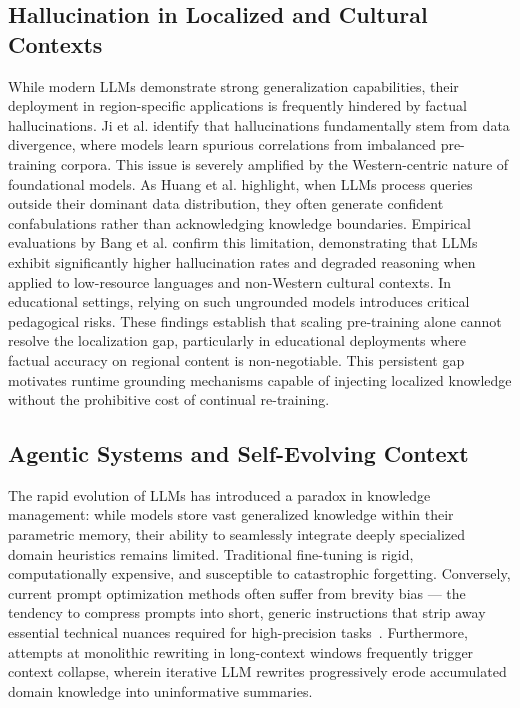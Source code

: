 \documentclass[10pt,conference]{IEEEtran}
\begin{document}
\subsection{Hallucination in Localized and Cultural Contexts}
While modern LLMs demonstrate strong generalization capabilities, their deployment in region-specific applications is frequently hindered by factual hallucinations. Ji et al. \cite{ji2023survey} identify that hallucinations fundamentally stem from data divergence, where models learn spurious correlations from imbalanced pre-training corpora. This issue is severely amplified by the Western-centric nature of foundational models. As Huang et al. \cite{huang2023survey} highlight, when LLMs process queries outside their dominant data distribution, they often generate confident confabulations rather than acknowledging knowledge boundaries. Empirical evaluations by Bang et al. \cite{bang2023multitask} confirm this limitation, demonstrating that LLMs exhibit significantly higher hallucination rates and degraded reasoning when applied to low-resource languages and non-Western cultural contexts. In educational settings, relying on such ungrounded models introduces critical pedagogical risks. These findings establish that scaling pre-training alone cannot resolve 
the localization gap, particularly in educational deployments where 
factual accuracy on regional content is non-negotiable. This persistent 
gap motivates runtime grounding mechanisms capable of injecting 
localized knowledge without the prohibitive cost of continual 
re-training.

\subsection{Agentic Systems and Self-Evolving Context}
\label{subsec:agentic}
The rapid evolution of LLMs has introduced a paradox in knowledge 
management: while models store vast generalized knowledge within their 
parametric memory, their ability to seamlessly integrate deeply 
specialized domain heuristics remains limited. Traditional fine-tuning 
is rigid, computationally expensive, and susceptible to catastrophic 
forgetting. Conversely, current prompt optimization methods often 
suffer from brevity bias --- the tendency to compress prompts 
into short, generic instructions that strip away essential technical 
nuances required for high-precision tasks~\cite{promptalchemist2025}. 
Furthermore, attempts at monolithic rewriting in long-context windows 
frequently trigger context collapse, wherein iterative LLM 
rewrites progressively erode accumulated domain knowledge into 
uninformative summaries.
\end{document}
